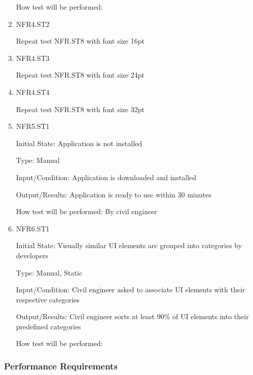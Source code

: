 \documentclass[12pt, titlepage]{article}
\begin{document}
\begin{enumerate}
How test will be performed: 

\item{NFR4.ST2\\}

Repeat test NFR.ST8 with font size 16pt

\item{NFR4.ST3\\}

Repeat test NFR.ST8 with font size 24pt

\item{NFR4.ST4\\}

Repeat test NFR.ST8 with font size 32pt

\item{NFR5.ST1\\}

Initial State: Application is not installed

Type: Manual

Input/Condition: Application is downloaded and installed

Output/Results: Application is ready to use within 30 minutes

How test will be performed: By civil engineer

\item{NFR6.ST1\\}

Initial State: Visually similar UI elements are grouped into categories by developers

Type: Manual, Static

Input/Condition: Civil engineer asked to associate UI elements with their respective categories

Output/Results: Civil engineer sorts at least 90\% of UI elements into their predefined categories

How test will be performed: 

\end{enumerate}

\subsubsection{Performance Requirements}
\end{document}
